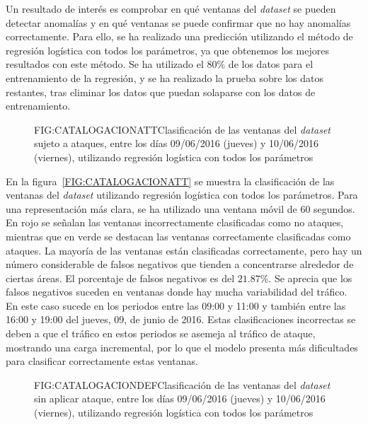 Un resultado de interés es comprobar en qué ventanas del \textit{dataset} se pueden detectar anomalías y en qué ventanas se puede confirmar que no hay anomalías correctamente. Para ello, se ha realizado una predicción utilizando el método de regresión logística con todos los parámetros, ya que obtenemos los mejores resultados con este método. Se ha utilizado el $80\%$ de los datos para el entrenamiento de la regresión, y se ha realizado la prueba sobre los datos restantes, tras eliminar los datos que puedan solaparse con los datos de entrenamiento.

\begin{figure}[Clasificación de las ventanas del \textit{dataset} sujeto a ataques, entre los días 09/06/2016 (jueves) y 10/06/2016 (viernes), utilizando regresión logística con todos los parámetros]{FIG:CATALOGACIONATT}{Clasificación de las ventanas del \textit{dataset} sujeto a ataques, entre los días 09/06/2016 (jueves) y 10/06/2016 (viernes), utilizando regresión logística con todos los parámetros}
\end{figure}

En la figura~\ref{FIG:CATALOGACIONATT} se muestra la clasificación de las ventanas del \textit{dataset} utilizando regresión logística con todos los parámetros. Para una representación más clara, se ha utilizado una ventana móvil de 60 segundos.
En rojo se señalan las ventanas incorrectamente clasificadas como no ataques, mientras que en verde se destacan las ventanas correctamente clasificadas como ataques. La mayoría de las ventanas están clasificadas correctamente, pero hay un número considerable de falsos negativos que tienden a concentrarse alrededor de ciertas áreas. El porcentaje de falsos negativos es del $21.87\%$. Se aprecia que los falsos negativos suceden en ventanas donde hay mucha variabilidad del tráfico. En este caso sucede en los periodos entre las 09:00 y 11:00 y también entre las 16:00 y 19:00 del jueves, 09, de junio de 2016. Estas clasificaciones incorrectas se deben a que el tráfico en estos periodos se asemeja al tráfico de ataque, mostrando una carga incremental, por lo que el modelo presenta más dificultades para clasificar correctamente estas ventanas.

\begin{figure}[Clasificación de las ventanas del \textit{dataset} sin aplicar ataque, entre los días 09/06/2016 (jueves) y 10/06/2016 (viernes), utilizando regresión logística con todos los parámetros]{FIG:CATALOGACIONDEF}{Clasificación de las ventanas del \textit{dataset} sin aplicar ataque, entre los días 09/06/2016 (jueves) y 10/06/2016 (viernes), utilizando regresión logística con todos los parámetros}
    \label{FIG:CATALOGACIONDEF}
\end{figure}


